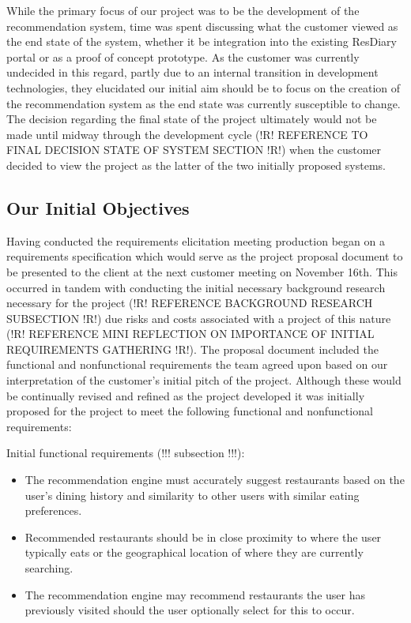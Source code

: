 \documentclass{l3proj}
\begin{document}
While the primary focus of our project was to be the development of the recommendation system, time was spent discussing what the customer viewed as the end state of the system, whether it be integration into the existing ResDiary portal or as a proof of concept prototype. As the customer was currently undecided in this regard, partly due to an internal transition in development technologies, they elucidated our initial aim should be to focus on the creation of the recommendation system as the end state was currently susceptible to change. The decision regarding the final state of the project ultimately would not be made until midway through the development cycle (!R! REFERENCE TO FINAL DECISION STATE OF SYSTEM SECTION !R!) when the customer decided to view the project as the latter of the two initially proposed systems.


\subsection{Our Initial Objectives}
\label{sec:ourinitobjectives}

Having conducted the requirements elicitation meeting production began on a requirements specification which would serve as the project proposal document to be presented to the client at the next customer meeting on November 16th. This occurred in tandem with conducting the initial necessary background research necessary for the project (!R! REFERENCE BACKGROUND RESEARCH SUBSECTION !R!) due risks and costs associated with a project of this nature (!R! REFERENCE MINI REFLECTION ON IMPORTANCE OF INITIAL REQUIREMENTS GATHERING !R!). The proposal document included the functional and nonfunctional requirements the team agreed upon based on our interpretation of the customer’s initial pitch of the project. Although these would be continually revised and refined as the project developed it was initially proposed for the project to meet the following functional and nonfunctional requirements:

Initial functional requirements (!!! subsection !!!):
\begin{itemize}
\item The recommendation engine must accurately suggest restaurants based on the user’s dining history and similarity to other users with similar eating preferences.
\item Recommended restaurants should be in close proximity to where the user typically eats or the geographical location of where they are currently searching.
\item The recommendation engine may recommend restaurants the user has previously visited should the user optionally select for this to occur.
\end{itemize}
\end{document}
